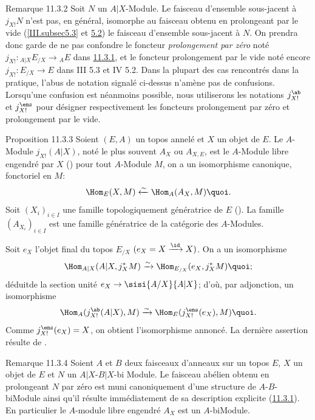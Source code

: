 \documentclass[10pt]{../fichiers-configuration-latex/smfart}
\begin{document}
\begin{enonce*}[remark]{Remarque 11.3.2}
Soit $N$ un $A| X$-Module. Le faisceau d'ensemble sous-jacent à
$j_{X!}N$ n'est pas, en général, isomorphe au faisceau obtenu en
prolongeant par le vide (\ref{III.subsec5.3} et \hyperref[IV.subsec5.2]{5.2}) le faisceau
d'ensemble sous-jacent à $N$. On prendra donc garde de ne pas
confondre le foncteur \emph{prolongement par zéro} noté
$j_{X!}:{}_{A|X}E_{/X}\rightarrow {}_{A}E$ dans \hyperref[IV.prop11.3.1]{11.3.1},
et le foncteur prolongement par le vide noté encore
$j_{X!}:E_{/X}\rightarrow E$ dans III 5.3 et IV 5.2. Dans la plupart
des cas rencontrés dans la pratique, l'abus de notation signalé
ci-dessus n'amène pas de confusions. Lorsqu'une confusion est
néanmoins possible, nous utiliserons les notations $j^{\ab}_{X!}$ et
$j^{\ens}_{X!}$ pour désigner respectivement les foncteurs
prolongement par zéro et prolongement par le vide.
\end{enonce*}

\begin{enonce*}{Proposition 11.3.3}
Soient $(E,A)$ un topos annelé et $X$ un objet de $E$. Le $A$-Module
$j_{X!}(A| X)$, noté le plus souvent $A_X$ ou $A_{X,E}$, est le
$A$-Module libre engendré par $X$ {\rm ()} \ie pour
tout $A$-Module $M$, on a un isomorphisme canonique, fonctoriel en
$M$:
$$
\Hom_E(X,M)\xleftarrow{\sim} \Hom_A (A_X, M){\quoi}.
$$
Soit $(X_i)_{i\in I}$ une famille topologiquement génératrice de $E$
{\rm ().} La famille $(A_{X_i})_{i\in I}$ est une
famille génératrice de la catégorie des $A$-Modules.
\end{enonce*}

Soit $e_X$ l'objet final du topos $E_{/X}$
$(e_X=X\xrightarrow{\id}X)$. On a un isomorphisme
$$
\Hom_{A| X}(A| X, j^{\ast}_X M)\xrightarrow{\sim} \Hom_{E_{/X}}(e_X,
j^{\ast}_X M){\quoi};
$$
déduit\pageoriginale de la section unité $e_X\rightarrow \sisi{A/X}{A|X}$; d'où,
par adjonction, un isomorphisme
$$
\Hom_A(j^{\ab}_{X!}(A| X),
M)\xrightarrow{\sim}\Hom_E(j^{\ens}_{X!}(e_X),M){\quoi}.
$$
Comme $j^{\ens}_{X!}(e_X)=X$, on obtient l'isomorphisme annoncé. La
dernière assertion résulte de .

\begin{enonce*}[remark]{Remarque 11.3.4}
Soient $A$ et $B$ deux faisceaux d'anneaux sur un topos $E$, $X$ un
objet de $E$ et $N$ un $A|X$-$B| X$-bi Module. Le faisceau abélien
obtenu en prolongeant $N$ par zéro est muni canoniquement d'une
structure de $A$-$B$-biModule ainsi qu'il résulte immédiatement de
sa description explicite (\hyperref[IV.prop11.3.1]{11.3.1}). En particulier le
$A$-module libre engendré $A_X$ est un $A$-biModule.
\end{enonce*}
\end{document}
